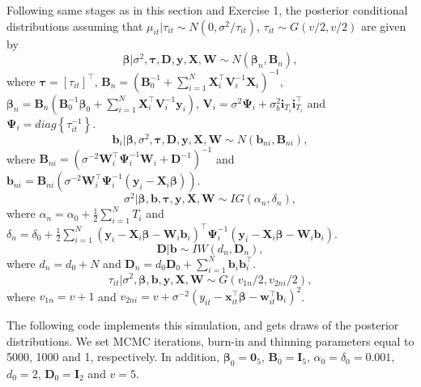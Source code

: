 Following same stages as in this section and Exercise 1, the posterior conditional distributions assuming that $\mu_{it}|\tau_{it}\sim N(0, \sigma^2/\tau_{it})$, $\tau_{it}\sim G(v/2,v/2)$ are given by 
\begin{equation*}
	\bm{\beta}|\sigma^2,\bm{\tau},\bm{D},\bm{y}, \bm{X}, \bm{W} \sim {N}(\bm{\beta}_n,\bm{B}_n), 
\end{equation*}
where $\bm{\tau}=[\tau_{it}]^{\top}$, $\bm{B}_n = (\bm{B}_0^{-1} +\sum_{i=1}^N \bm{X}_i^{\top}\bm{V}_i^{-1}\bm{X}_i)^{-1}$, $\bm{\beta}_n= \bm{B}_n(\bm{B}_0^{-1}\bm{\beta}_0 + \sum_{i=1}^N\bm{X}_i^{\top}\bm{V}_i^{-1}\bm{y}_i)$, $\bm{V}_i=\sigma^2\bm{\Psi}_i+\sigma_{b}^2\bm{i}_{T_i}\bm{i}_{T_i}^{\top}$ and $\bm{\Psi}_i=diag\left\{\tau_{it}^{-1}\right\}$.
\begin{equation*}
	\bm{b}_i|\bm{\beta},\sigma^2,\bm{\tau},\bm{D},\bm{y}, \bm{X}, \bm{W} \sim {N}(\bm{b}_{ni},\bm{B}_{ni}), 
\end{equation*} 
where $\bm{B}_{ni}=(\sigma^{-2}\bm{W}_i^{\top}\bm{\Psi}_i^{-1}\bm{W}_i+\bm{D}^{-1})^{-1}$ and $\bm{b}_{ni}=\bm{B}_{ni}(\sigma^{-2}\bm{W}_i^{\top}\bm{\Psi}_i^{-1}(\bm{y}_i-\bm{X}_i\bm{\beta}))$.
\begin{equation*}
	\sigma^2| \bm{\beta}, \bm{b}, \bm{\tau}, \bm{y}, \bm{X}, \bm{W} \sim {I}{G}(\alpha_n, \delta_n),
\end{equation*}
where $\alpha_n=\alpha_0+\frac{1}{2}\sum_{i=1}^N T_i$ and $\delta_n=\delta_0+\frac{1}{2}\sum_{i=1}^N(\bm{y}_i-\bm{X}_i\bm{\beta}-\bm{W}_i\bm{b}_i)^{\top}\bm{\Psi}_i^{-1}(\bm{y}_i-\bm{X}_i\bm{\beta}-\bm{W}_i\bm{b}_i)$.  
\begin{equation*}
	\bm{D}| \bm{b} \sim {I}{W}(d_n, \bm{D}_n),
\end{equation*}
where $d_n=d_0+N$ and $\bm{D}_n=d_0\bm{D}_0+\sum_{i=1}^N\bm{b}_i\bm{b}_i^{\top}$.
\begin{equation*}
	\tau_{it}|\sigma^2, \bm{\beta}, \bm{b}, \bm{y}, \bm{X}, \bm{W} \sim {G}(v_{1n}/2, v_{2ni}/2),
\end{equation*}
where $v_{1n}=v+1$ and $v_{2ni}=v+\sigma^{-2}(y_{it}-\bm{x}_{it}^{\top}\bm{\beta}-\bm{w}_{it}^{\top}\bm{b}_i)^2$.

The following code implements this simulation, and gets draws of the posterior distributions. We set MCMC iterations, burn-in and thinning parameters equal to 5000, 1000 and 1, respectively. In addition, $\bm{\beta}_0=\bm{0}_5$, $\bm{B}_0=\bm{I}_5$, $\alpha_0=\delta_0=0.001$, $d_0=2$, $\bm{D}_0=\bm{I}_2$ and $v=5$.

